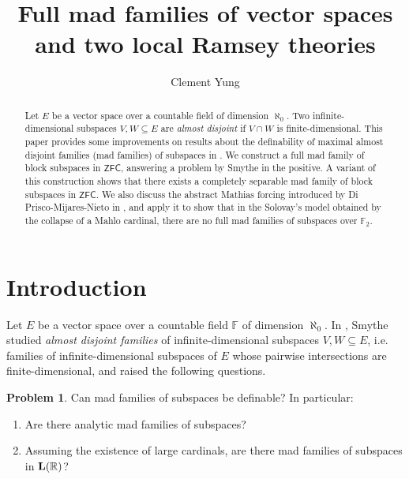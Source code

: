 \documentclass[11pt,reqno]{amsart}
\title[Full mad families of vector spaces]{Full mad families of vector spaces and two local Ramsey theories}
\author{Clement Yung}
\theoremstyle{plain}
\numberwithin{equation}{section}
\theoremstyle{definition}
\newtheorem{prob}[theorem]{Problem}
\newcommand{\R}{\mathbb{R}}
\newcommand{\ZFC}{\mathsf{ZFC}}
\let\strokeL\L
\DeclareRobustCommand{\L}{\ifmmode\mathbf{L}\else\strokeL\fi}
\begin{document}
\begin{abstract}
    Let $E$ be a vector space over a countable field of dimension $\aleph_0$. Two infinite-dimensional subspaces $V,W \subseteq E$ are \emph{almost disjoint} if $V \cap W$ is finite-dimensional. This paper provides some improvements on results about the definability of maximal almost disjoint families (mad families) of subspaces in \cite{S19}. We construct a full mad family of block subspaces in $\ZFC$, answering a problem by Smythe in the positive. A variant of this construction shows that there exists a completely separable mad family of block subspaces in $\ZFC$. We also discuss the abstract Mathias forcing introduced by Di Prisco-Mijares-Nieto in \cite{DMN15}, and apply it to show that in the Solovay's model obtained by the collapse of a Mahlo cardinal, there are no full mad families of subspaces over $\mathbb{F}_2$.
\end{abstract}

\maketitle

\section{Introduction}
\label{sec:intro}


Let $E$ be a vector space over a countable field $\mathbb{F}$ of dimension $\aleph_0$. In \cite{S19}, Smythe studied \emph{almost disjoint families} of infinite-dimensional subspaces $V,W \subseteq E$, i.e. families of infinite-dimensional subspaces of $E$ whose pairwise intersections are finite-dimensional, and raised the following questions.
\begin{prob}
\label{prob:definable.mad.families}
    Can mad families of subspaces be definable? In particular:
    \begin{enumerate}
        \item Are there analytic mad families of subspaces?
        
        \item Assuming the existence of large cardinals, are there mad families of subspaces in $\L(\R)$?
    \end{enumerate}
\end{prob}
\end{document}
